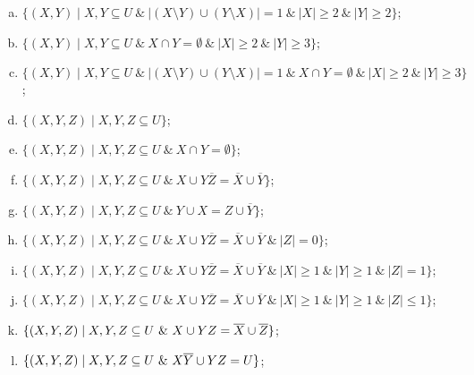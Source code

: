 \begin{problem}
\begin{enumerate}[a)]
  \item
    $\{(X,Y) \mid X,Y\subseteq U\ \&\ |(X\setminus Y)\cup(Y\setminus X)| = 1\ \&\ |X|\geq 2\ \&\ |Y|\geq 2\}$;
  \item
    $\{(X,Y) \mid X,Y\subseteq U\ \&\ X\cap Y = \emptyset\ \&\ |X|\geq 2\ \&\ |Y|\geq 3\}$;
  \item
    $\{(X,Y) \mid X,Y\subseteq U\ \&\ |(X\setminus Y)\cup(Y\setminus X)| = 1\ \&\ X\cap Y = \emptyset\ \&\ |X|\geq 2\ \&\ |Y|\geq 3\}$;
  \item
    $\{(X,Y,Z) \mid X,Y,Z\subseteq U\}$;
  \item
    $\{(X,Y,Z) \mid X,Y,Z\subseteq U\ \&\ X \cap Y = \emptyset\}$;
  \item
    $\{(X,Y,Z) \mid X,Y,Z\subseteq U\ \&\ X\cup Y\overline{Z} = \overline{X}\cup\overline{Y}\}$;
  \item
    $\{(X,Y,Z) \mid X,Y,Z\subseteq U\ \&\ Y\cup X = Z\cup\overline{Y}\}$;
  \item
    $\{(X,Y,Z) \mid X,Y,Z\subseteq U\ \&\ X\cup Y\overline{Z} = \overline{X}\cup\overline{Y}\ \&\ |Z| = 0\}$;
  \item
    $\{(X,Y,Z) \mid X,Y,Z \subseteq U\ \&\ X\cup Y\overline{Z} = \overline{X}\cup\overline{Y}\ \&\ |X|\geq 1\ \&\ |Y|\geq 1\ \&\ |Z| = 1\}$;
  \item
    $\{(X,Y,Z) \mid X,Y,Z\subseteq U\ \&\ X\cup Y\overline{Z} = \overline{X}\cup\overline{Y}\ \&\ |X|\geq 1\ \&\ |Y|\geq 1\ \&\ |Z|\leq 1\}$;
  \item
    $\{(X,Y,Z) \mid X,Y,Z\subseteq U\ \&\ X \cup YZ = \ov{X} \cup \ov{Z}\}$;
  \item
    $\{(X,Y,Z) \mid X,Y,Z\subseteq U\ \&\ X\ov{Y} \cup YZ = U\}$;
  \end{enumerate}
\end{problem}
